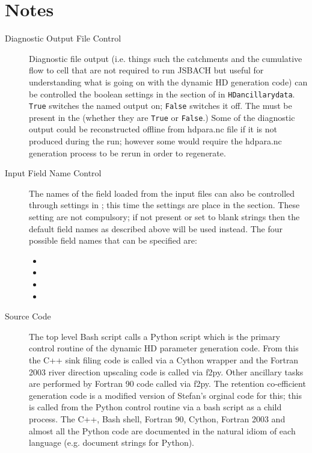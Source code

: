 \documentclass{article}
\begin{document}
\section{Notes} \label{section-notes}
\begin{description}
\item[Diagnostic Output File Control] Diagnostic file output (i.e. things such the catchments and the cumulative flow to cell that are not required to run JSBACH but useful for understanding what is going on with the dynamic HD generation code)  can be controlled the boolean settings in the  section of  in \texttt{HDancillarydata}. \texttt{True} switches the named output on; \texttt{False} switches it off. The   must be present in the  (whether they are \texttt{True} or \texttt{False}.) Some of the diagnostic output could be reconstructed offline from hdpara.nc file if it is not produced during the run; however some would require the hdpara.nc generation process to be rerun in order to regenerate.
\item[Input Field Name Control] The names of the field loaded from the input files can also be controlled through settings in ; this time the settings are place in the  section. These setting are not compulsory; if not present or set to blank strings then the default field names as described above will be used instead. The four possible field names that can be specified are:
\begin{itemize}
\item {}
\item {}
\item {}
\item {}
\end{itemize}
\item[Source Code] The top level Bash script calls a Python script which is the primary control routine of the dynamic HD parameter generation code. From this the C++ sink filing code is called via a Cython wrapper and the Fortran 2003 river direction upscaling code is called via f2py. Other ancillary tasks are performed by Fortran 90 code called via f2py. The retention co-efficient generation code is a modified version of Stefan's orginal code for this; this is called from the Python control routine via a bash script as a child process. The C++, Bash shell, Fortran 90, Cython, Fortran 2003 and almost all the Python code are documented in the natural idiom of each language (e.g. document strings for Python).

\end{description}
\end{document}
